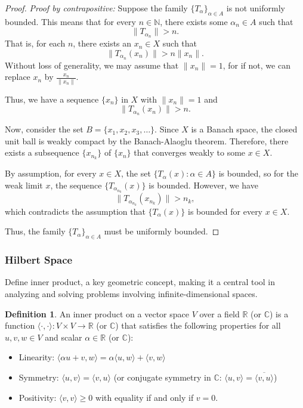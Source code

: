\documentclass[12pt, reqno]{amsart}
\theoremstyle{definition}
\newtheorem{definition}[theorem]{Definition}
\numberwithin{equation}{section}
\newcommand{\dR}{{\mathbb R}}
\newcommand{\dN}{{\mathbb N}}
\begin{document}
\begin{proof}

\textit{Proof by contrapositive:} Suppose the family $\{T_\alpha\}_{\alpha \in A}$ is not uniformly bounded. This means that for every $n \in \dN$, there exists some $\alpha_n \in A$ such that
$$ \|T_{\alpha_n}\| > n.$$
That is, for each $n$, there exists an $x_n \in X$ such that 
$$ \|T_{\alpha_n}(x_n)\| > n \|x_n\|.$$
Without loss of generality, we may assume that $\|x_n\| = 1$, for if not, we can replace $x_n$ by $\frac{x_n}{\|x_n\|}$.

Thus, we have a sequence $\{x_n\}$ in $X$ with $\|x_n\| = 1$ and 
$$ \|T_{\alpha_n}(x_n)\| > n.$$

Now, consider the set $B = \{x_1, x_2, x_3, \dots\}$. Since $X$ is a Banach space, the closed unit ball is weakly compact by the Banach-Alaoglu theorem. Therefore, there exists a subsequence $\{x_{n_k}\}$ of $\{x_n\}$ that converges weakly to some $x \in X$.

By assumption, for every $x \in X$, the set $\{T_\alpha(x) : \alpha \in A\}$ is bounded, so for the weak limit $x$, the sequence $\{T_{\alpha_{n_k}}(x)\}$ is bounded. However, we have
$$ \|T_{\alpha_{n_k}}(x_{n_k})\| > n_k,$$
which contradicts the assumption that $\{T_\alpha(x)\}$ is bounded for every $x \in X$. 

Thus, the family $\{T_\alpha\}_{\alpha \in A}$ must be uniformly bounded.
\end{proof}

\subsubsection{Hilbert Space}
Define inner product, a key geometric concept, making it a central tool in analyzing and solving problems involving infinite-dimensional spaces.
    \begin{definition}
        An inner product on a vector space $V$ over a field $\dR$ (or $\mathbb{C}$) is a function $\langle \cdot, \cdot \rangle : V \times V \to \dR$ (or $\mathbb{C}$) that satisfies the following properties for all $u, v, w \in V$ and scalar $\alpha \in \dR$ (or $\mathbb{C}$):

\begin{itemize}
    \item Linearity: $\langle \alpha u + v, w \rangle = \alpha \langle u, w \rangle + \langle v, w \rangle$
    \item Symmetry: $\langle u, v \rangle = \langle v, u \rangle$ (or conjugate symmetry in $\mathbb{C}$: $\langle u, v \rangle = \overline{\langle v, u \rangle}$)
    \item Positivity: $\langle v, v \rangle \geq 0$ with equality if and only if $v = 0$.
\end{itemize}
    \end{definition}
\end{document}
